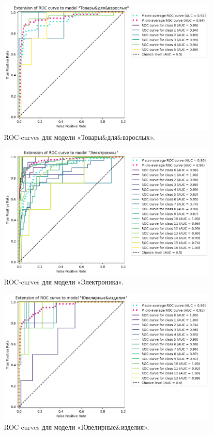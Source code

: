 \documentclass[a4paper,12pt]{extarticle}
\begin{document}
\begin{figure}[hbtp]
	\centering
	\includegraphics[scale=0.7]{roc_curves/roccurve_Товары&для&взрослых.png}
	\caption{ROC-curves для модели «Товары\&для\&взрослых».}
	\label{fig:roccurve_Товары&для&взрослых}
\end{figure}

\begin{figure}[hbtp]
	\centering
	\includegraphics[scale=0.7]{roc_curves/roccurve_Электроника.png}
	\caption{ROC-curves для модели «Электроника».}
	\label{fig:roccurve_Электроника}
\end{figure}

\begin{figure}[hbtp]
	\centering
	\includegraphics[scale=0.7]{roc_curves/roccurve_Ювелирные&изделия.png}
	\caption{ROC-curves для модели «Ювелирные\&изделия».}
	\label{fig:roccurve_Ювелирные&изделия}
\end{figure}
\end{document}
